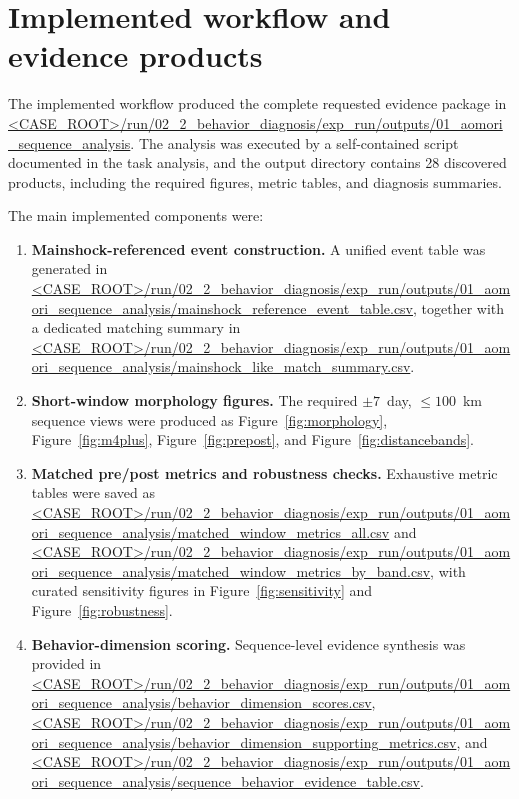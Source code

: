 \documentclass[11pt]{article}
\begin{document}
\section{Implemented workflow and evidence products}
The implemented workflow produced the complete requested evidence package in
\url{<CASE_ROOT>/run/02_2_behavior_diagnosis/exp_run/outputs/01_aomori_sequence_analysis}.
The analysis was executed by a self-contained script documented in the task analysis, and the output directory contains 28 discovered products, including the required figures, metric tables, and diagnosis summaries.

The main implemented components were:
\begin{enumerate}[leftmargin=1.5em]
    \item \textbf{Mainshock-referenced event construction.} A unified event table was generated in
    \url{<CASE_ROOT>/run/02_2_behavior_diagnosis/exp_run/outputs/01_aomori_sequence_analysis/mainshock_reference_event_table.csv},
    together with a dedicated matching summary in
    \url{<CASE_ROOT>/run/02_2_behavior_diagnosis/exp_run/outputs/01_aomori_sequence_analysis/mainshock_like_match_summary.csv}.

    \item \textbf{Short-window morphology figures.} The required $\pm 7$~day, $\leq 100$~km sequence views were produced as
    Figure~\ref{fig:morphology}, Figure~\ref{fig:m4plus}, Figure~\ref{fig:prepost}, and Figure~\ref{fig:distancebands}.

    \item \textbf{Matched pre/post metrics and robustness checks.} Exhaustive metric tables were saved as
    \url{<CASE_ROOT>/run/02_2_behavior_diagnosis/exp_run/outputs/01_aomori_sequence_analysis/matched_window_metrics_all.csv}
    and
    \url{<CASE_ROOT>/run/02_2_behavior_diagnosis/exp_run/outputs/01_aomori_sequence_analysis/matched_window_metrics_by_band.csv},
    with curated sensitivity figures in Figure~\ref{fig:sensitivity} and Figure~\ref{fig:robustness}.

    \item \textbf{Behavior-dimension scoring.} Sequence-level evidence synthesis was provided in
    \url{<CASE_ROOT>/run/02_2_behavior_diagnosis/exp_run/outputs/01_aomori_sequence_analysis/behavior_dimension_scores.csv},
    \url{<CASE_ROOT>/run/02_2_behavior_diagnosis/exp_run/outputs/01_aomori_sequence_analysis/behavior_dimension_supporting_metrics.csv},
    and
    \url{<CASE_ROOT>/run/02_2_behavior_diagnosis/exp_run/outputs/01_aomori_sequence_analysis/sequence_behavior_evidence_table.csv}.


\end{enumerate}
\end{document}
